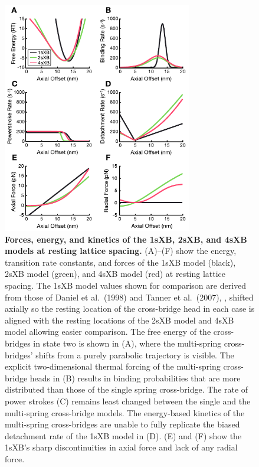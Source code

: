 \documentclass[10pt]{article}
\newcommand{\citep}[1]{\cite{#1}} %
\begin{document}
\begin{figure}[!ht]
    \begin{center}
    \includegraphics[width=3.25in]{../imgs/fig_kinetics_cuts.pdf}
    \caption{ \textbf{Forces, energy, and kinetics of the 1sXB, 2sXB, and 4sXB models at resting lattice spacing.}
        (A)--(F) show the energy, transition rate constants, and forces of the 1sXB model (black), 2sXB model (green), and 4sXB model (red) at resting lattice spacing.  
        The 1sXB model values shown for comparison are derived from those of Daniel et al.~(1998) and Tanner et al.~(2007), \protect\citep{Daniel1998, Tanner2007}, shifted axially so the resting location of the cross-bridge head in each case is aligned with the resting locations of the 2sXB model and 4sXB model allowing easier comparison. 
        The free energy of the cross-bridges in state two is shown in (A), where the multi-spring cross-bridges' shifts from a purely parabolic trajectory is visible. 
        The explicit two-dimensional thermal forcing of the multi-spring cross-bridge heads in (B) results in binding probabilities that are more distributed than those of the single spring cross-bridge.
        The rate of power strokes (C) remains least changed between the single and the multi-spring cross-bridge models.  
        The energy-based kinetics of the multi-spring cross-bridges are unable to fully replicate the biased detachment rate of the 1sXB model in (D).
        (E) and (F) show the 1sXB's sharp discontinuities in axial force and lack of any radial force.
        \label{fig_kinetics_cuts}
        }
    \end{center}
\end{figure}
\end{document}
